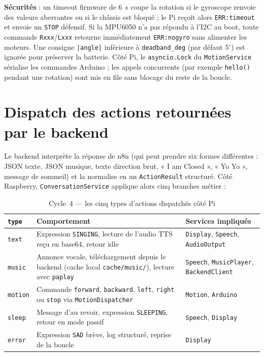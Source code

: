 \documentclass[a4paper,12pt]{report}
\begin{document}
	\textbf{Sécurités} : un timeout firmware de 6~s coupe la rotation si le
	gyroscope renvoie des valeurs aberrantes ou si le châssis est bloqué ; le
	Pi reçoit alors \texttt{ERR:timeout} et envoie un \texttt{STOP} défensif.
	Si la MPU6050 n'a pas répondu à l'I2C au boot, toute commande
	\texttt{Rxxx}/\texttt{Lxxx} retourne immédiatement \texttt{ERR:nogyro}
	sans alimenter les moteurs. Une consigne \texttt{|angle|} inférieure à
	\texttt{deadband\_deg} (par défaut 5$^\circ$) est ignorée pour préserver la
	batterie. Côté Pi, le \texttt{asyncio.Lock} du \texttt{MotionService}
	sérialise les commandes Arduino ; les appels concurrents (par exemple
	\texttt{hello()} pendant une rotation) sont mis en file sans blocage du
	reste de la boucle.
	
	\section{Dispatch des actions retournées par le backend}
	
	Le backend interprète la réponse de n8n (qui peut prendre six formes
	différentes : JSON texte, JSON musique, texte direction brut, « I am
	Closed », « Yo Yo », message de sommeil) et la normalise en un
	\texttt{ActionResult} structuré. Côté Raspberry,
	\texttt{ConversationService} applique alors cinq branches métier :
	
	\begin{table}[H]
		\centering
		\caption{Cycle~4 --- les cinq types d'actions dispatchés côté Pi}
		\label{tab:ch4-actions}
		\renewcommand{\arraystretch}{1.25}
		\begin{tabularx}{\textwidth}{|>{\raggedright\arraybackslash}p{2.2cm}|>{\raggedright\arraybackslash}X|>{\raggedright\arraybackslash}p{3.4cm}|}
			\hline
			\textbf{\texttt{type}} & \textbf{Comportement} & \textbf{Services impliqués} \\
			\hline
			\texttt{text}   & Expression \texttt{SINGING}, lecture de l'audio TTS reçu en base64, retour idle & \texttt{Display}, \texttt{Speech}, \texttt{AudioOutput} \\
			\hline
			\texttt{music}  & Annonce vocale, téléchargement depuis le backend (cache local \texttt{cache/music/}), lecture avec \texttt{paplay} & \texttt{Speech}, \texttt{MusicPlayer}, \texttt{BackendClient} \\
			\hline
			\texttt{motion} & Commande \texttt{forward}, \texttt{backward}, \texttt{left}, \texttt{right} ou \texttt{stop} via \texttt{MotionDispatcher} & \texttt{Motion}, \texttt{Arduino} \\
			\hline
			\texttt{sleep}  & Message d'au revoir, expression \texttt{SLEEPING}, retour en mode passif & \texttt{Speech}, \texttt{Display} \\
			\hline
			\texttt{error}  & Expression \texttt{SAD} brève, log structuré, reprise de la boucle & \texttt{Display} \\
			\hline
		\end{tabularx}
	\end{table}
	
\end{document}
